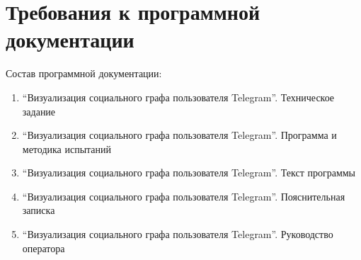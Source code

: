\section{Требования к программной документации}

Состав программной документации:

\begin{enumerate}
    \item ``Визуализация социального графа пользователя Telegram''. Техническое задание \cite{gostTZ}
    \item ``Визуализация социального графа пользователя Telegram''. Программа и методика испытаний \cite{gostPMI}
    \item ``Визуализация социального графа пользователя Telegram''. Текст программы \cite{gostTP}
    \item ``Визуализация социального графа пользователя Telegram''. Пояснительная записка \cite{gostPZ}
    \item ``Визуализация социального графа пользователя Telegram''. Руководство оператора \cite{gostRO}
\end{enumerate}